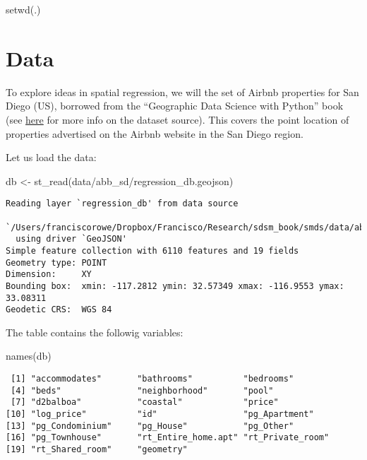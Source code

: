 \documentclass[
  letterpaper,
  krantz2]{style/krantz}
\newenvironment{Shaded}{\begin{snugshade}}{\end{snugshade}}
\newcommand{\FunctionTok}[1]{\textcolor[rgb]{0.28,0.35,0.67}{#1}}
\newcommand{\NormalTok}[1]{\textcolor[rgb]{0.00,0.23,0.31}{#1}}
\newcommand{\OtherTok}[1]{\textcolor[rgb]{0.00,0.23,0.31}{#1}}
\newcommand{\StringTok}[1]{\textcolor[rgb]{0.13,0.47,0.30}{#1}}
\begin{document}
\begin{Shaded}
\begin{Highlighting}[]
\FunctionTok{setwd}\NormalTok{(}\StringTok{\textquotesingle{}.\textquotesingle{}}\NormalTok{)}
\end{Highlighting}
\end{Shaded}

\hypertarget{data-2}{%
\section{Data}\label{data-2}}

To explore ideas in spatial regression, we will the set of Airbnb
properties for San Diego (US), borrowed from the ``Geographic Data
Science with Python'' book (see
\href{https://geographicdata.science/book/data/airbnb/regression_cleaning.html}{here}
for more info on the dataset source). This covers the point location of
properties advertised on the Airbnb website in the San Diego region.

Let us load the data:

\begin{Shaded}
\begin{Highlighting}[]
\NormalTok{db }\OtherTok{\textless{}{-}} \FunctionTok{st\_read}\NormalTok{(}\StringTok{\textquotesingle{}data/abb\_sd/regression\_db.geojson\textquotesingle{}}\NormalTok{)}
\end{Highlighting}
\end{Shaded}

\begin{verbatim}
Reading layer `regression_db' from data source 
  `/Users/franciscorowe/Dropbox/Francisco/Research/sdsm_book/smds/data/abb_sd/regression_db.geojson' 
  using driver `GeoJSON'
Simple feature collection with 6110 features and 19 fields
Geometry type: POINT
Dimension:     XY
Bounding box:  xmin: -117.2812 ymin: 32.57349 xmax: -116.9553 ymax: 33.08311
Geodetic CRS:  WGS 84
\end{verbatim}

The table contains the followig variables:

\begin{Shaded}
\begin{Highlighting}[]
\FunctionTok{names}\NormalTok{(db)}
\end{Highlighting}
\end{Shaded}

\begin{verbatim}
 [1] "accommodates"       "bathrooms"          "bedrooms"          
 [4] "beds"               "neighborhood"       "pool"              
 [7] "d2balboa"           "coastal"            "price"             
[10] "log_price"          "id"                 "pg_Apartment"      
[13] "pg_Condominium"     "pg_House"           "pg_Other"          
[16] "pg_Townhouse"       "rt_Entire_home.apt" "rt_Private_room"   
[19] "rt_Shared_room"     "geometry"          
\end{verbatim}
\end{document}

